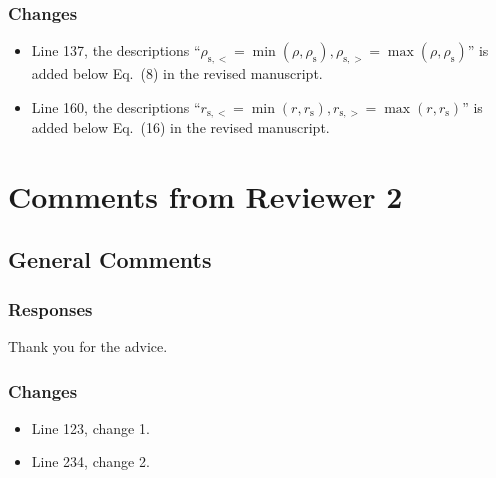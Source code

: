 \documentclass{article}
\newcommand{\rev}[1]{{\leavevmode\color{red}#1}}
\begin{document}
\subsubsection*{Changes}
\begin{itemize}
    \item 
        Line 137, the descriptions 
        ``\rev{$
            \rho_\mathrm{s,<} = \min(\rho, \rho_\mathrm{s}), 
            \rho_\mathrm{s,>} = \max(\rho, \rho_\mathrm{s})
        $}''
        is added below Eq.~(8) in the revised manuscript.

    \item 
        Line 160, the descriptions
        ``\rev{$
            r_\mathrm{s,<} = \min(r,r_\mathrm{s}),
            r_\mathrm{s,>} = \max(r,r_\mathrm{s})
        $}''
        is added below Eq.~(16) in the revised manuscript.
\end{itemize}



\newpage
\section{Comments from Reviewer 2}

\subsection{General Comments}
\lipsum[6]

\lipsum[7]

\subsubsection*{Responses}
Thank you for the advice. 

\subsubsection*{Changes}
\begin{itemize}
    \item Line 123, change 1.
    \item Line 234, change 2.
\end{itemize}
\end{document}

